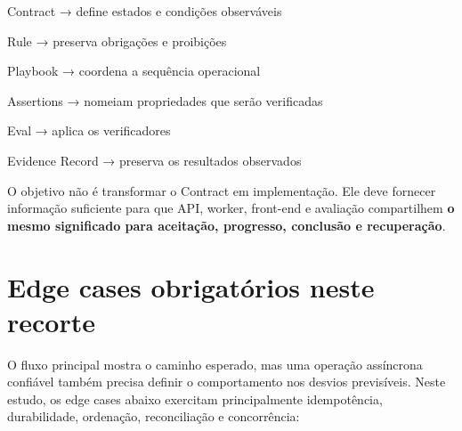 \documentclass[
  10pt,
  a4paper,
  oneside]{book}
\newenvironment{Shaded}{}{}
\newcommand{\NormalTok}[1]{#1}
\renewenvironment{Shaded}{\begin{snugshade}}{\end{snugshade}}%
\begin{document}
\begin{Shaded}
\begin{Highlighting}[]
\NormalTok{Contract}
\NormalTok{→ define estados e condições observáveis}

\NormalTok{Rule}
\NormalTok{→ preserva obrigações e proibições}

\NormalTok{Playbook}
\NormalTok{→ coordena a sequência operacional}

\NormalTok{Assertions}
\NormalTok{→ nomeiam propriedades que serão verificadas}

\NormalTok{Eval}
\NormalTok{→ aplica os verificadores}

\NormalTok{Evidence Record}
\NormalTok{→ preserva os resultados observados}
\end{Highlighting}
\end{Shaded}

O objetivo não é transformar o Contract em implementação. Ele deve
fornecer informação suficiente para que API, worker, front-end e
avaliação compartilhem \textbf{o mesmo significado para aceitação,
progresso, conclusão e recuperação}.

\hypertarget{edge-cases-obrigatuxf3rios-neste-recorte}{%
\section{Edge cases obrigatórios neste
recorte}\label{edge-cases-obrigatuxf3rios-neste-recorte}}

O fluxo principal mostra o caminho esperado, mas uma operação assíncrona
confiável também precisa definir o comportamento nos desvios
previsíveis. Neste estudo, os edge cases abaixo exercitam principalmente
idempotência, durabilidade, ordenação, reconciliação e concorrência:
\end{document}
